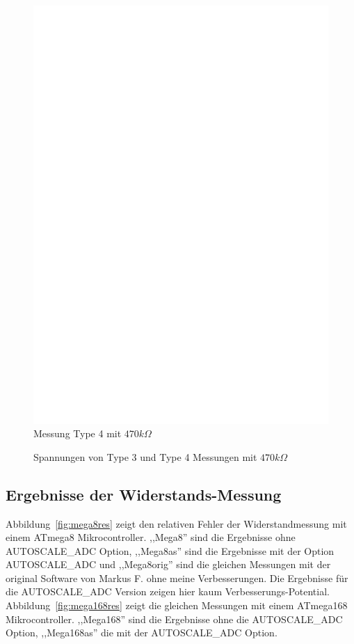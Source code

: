 \begin{figure}[H]
 \centering
 \includegraphics[]{../FIG/ResistormessH2.eps}
 \caption{Messung Type 4 mit \(470k\Omega\) }
\label{fig:RH2mes}
\end{figure}

\begin{figure}[H]
\centering

\caption{Spannungen von Type 3 und Type 4 Messungen mit \(470k\Omega\) }
\label{fig:RHv}
\end{figure}

\subsection{Ergebnisse der Widerstands-Messung}
Abbildung~\ref{fig:mega8res} zeigt den relativen Fehler der Widerstandmessung mit einem ATmega8
Mikrocontroller. ,,Mega8'' sind die Ergebnisse ohne AUTOSCALE\_ADC Option,
,,Mega8as'' sind die Ergebnisse mit der Option AUTOSCALE\_ADC und
,,Mega8orig'' sind die gleichen Messungen mit der original Software von Markus F. ohne meine Verbesserungen.
Die Ergebnisse f\"ur die AUTOSCALE\_ADC Version zeigen hier kaum Verbesserungs-Potential.
Abbildung~\ref{fig:mega168res} zeigt die gleichen Messungen mit einem ATmega168 Mikrocontroller.
,,Mega168'' sind die Ergebnisse ohne die AUTOSCALE\_ADC Option, ,,Mega168as'' die mit der
 AUTOSCALE\_ADC Option.

